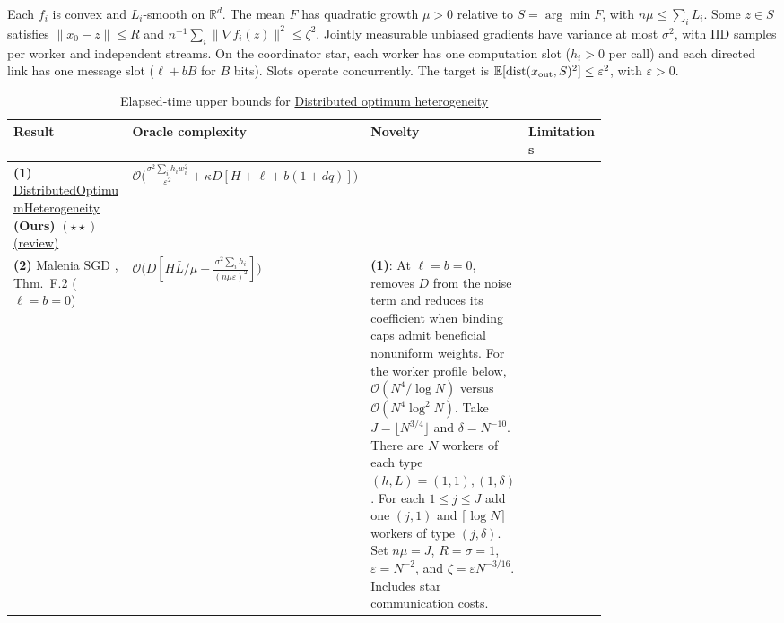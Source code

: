 \begin{table}[tp]
\centering
\caption{Elapsed-time upper bounds for \href{https://github.com/k3nfalt/longtails/blob/main/LongTails/Setups/DistributedOptimumHeterogeneity.lean}{Distributed optimum heterogeneity}}\label{tab:DistributedOptimumHeterogeneity}
\parbox{\linewidth}{\footnotesize Each $f_i$ is convex and $L_i$-smooth on $\mathbb R^d$. The mean $F$ has quadratic growth $\mu>0$ relative to $S=\arg\min F$, with $n\mu\le\sum_i L_i$. Some $z\in S$ satisfies $\|x_0-z\|\le R$ and $n^{-1}\sum_i\|\nabla f_i(z)\|^2\le\zeta^2$. Jointly measurable unbiased gradients have variance at most $\sigma^2$, with IID samples per worker and independent streams. On the coordinator star, each worker has one computation slot ($h_i>0$ per call) and each directed link has one message slot ($\ell+bB$ for $B$ bits). Slots operate concurrently. The target is $\mathbb E[\operatorname{dist}(x_{\rm out},S)^2]\le\varepsilon^2$, with $\varepsilon>0$.}\par\smallskip
\begin{threeparttable}
\footnotesize
\setlength{\tabcolsep}{4pt}\renewcommand{\arraystretch}{1.25}
\begin{tabularx}{\linewidth}{@{}>{\raggedright\arraybackslash}p{0.20\linewidth}>{\raggedright\arraybackslash}p{0.32\linewidth}>{\raggedright\arraybackslash}p{0.25\linewidth}>{\raggedright\arraybackslash}X@{}}
\toprule
\textbf{Result} & \textbf{Oracle complexity} & \textbf{Novelty} & \textbf{Limitations} \\
\midrule
\textbf{(1)} \href{https://github.com/k3nfalt/longtails/blob/main/LongTails/Theorems/DistributedOptimumHeterogeneity.lean}{Distributed\allowbreak{}Optimum\allowbreak{}Heterogeneity} \textbf{(Ours)} $(\star\star)$ \href{https://github.com/k3nfalt/longtails/blob/main/scripts/reviews/DistributedOptimumHeterogeneity.md}{(review)}
& $\mathcal{O}\bigl(\frac{\sigma^2\sum_i h_i w_i^2}{\varepsilon^2}+\kappa D[H+\ell+b(1+dq)]\bigr)$ & & \\
\midrule[1.2pt]
\textbf{(2)} Malenia SGD \citep{dwiTyurin2026v1}, Thm.~F.2 ($\ell=b=0$)
& $\mathcal{O}\bigl(D[H\bar L/\mu+\frac{\sigma^2\sum_i h_i}{(n\mu\varepsilon)^2}]\bigr)$
& \textbf{(1)}: At $\ell=b=0$, removes $D$ from the noise term and reduces its coefficient when binding caps admit beneficial nonuniform weights. For the worker profile below, $\mathcal{O}(N^4/\log N)$ versus $\mathcal{O}(N^4\log^2 N)$. Take $J=\lfloor N^{3/4}\rfloor$ and $\delta=N^{-10}$. There are $N$ workers of each type $(h,L)=(1,1),(1,\delta)$. For each $1\le j\le J$ add one $(j,1)$ and $\lceil\log N\rceil$ workers of type $(j,\delta)$. Set $n\mu=J$, $R=\sigma=1$, $\varepsilon=N^{-2}$, and $\zeta=\varepsilon N^{-3/16}$. Includes star communication costs.

\end{tabularx}
\end{threeparttable}
\end{table}
